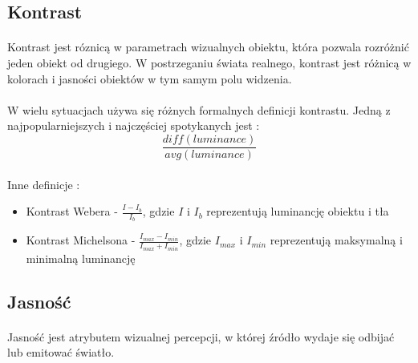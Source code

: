 \documentclass[wide,a4paper,titlepage,12pt] {article}
\begin{document}
\paragraph{} %
\label{par:}

\subsection{Kontrast}
\paragraph{} %
\label{par:}
Kontrast jest róznicą w parametrach wizualnych obiektu, która pozwala rozróżnić jeden obiekt od drugiego. W postrzeganiu świata realnego, kontrast jest różnicą w kolorach i jasności obiektów w tym samym polu widzenia.  

\paragraph{} %
\label{par:}
W wielu sytuacjach używa się różnych formalnych definicji kontrastu. Jedną z najpopularniejszych i najczęściej spotykanych jest : 
\begin{equation}
    \frac{diff(luminance)}{avg(luminance)}
\end{equation}

\paragraph{}
Inne definicje : 
\begin{itemize}
    \item Kontrast Webera - $\frac{I-I_{b}}{I_{b}}$, gdzie $I$ i $I_{b}$ reprezentują luminancję obiektu i tła
    \item Kontrast Michelsona -  $\frac{I_{max}-I_{min}}{I_{max}+I_{min}}$, gdzie $I_{max}$ i $I_{min}$ reprezentują maksymalną i minimalną luminancję 
\end{itemize}

\subsection{Jasność}
\paragraph{} %
\label{par:}
Jasność jest atrybutem wizualnej percepcji, w której źródło wydaje się odbijać lub emitować światło.
\end{document}
